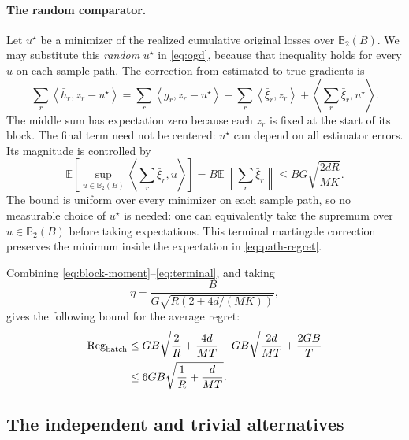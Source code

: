 \documentclass[11pt,a4paper]{article}
\numberwithin{equation}{section}
\theoremstyle{remark}
\newcommand{\E}{\mathbb E}
\newcommand{\norm}[1]{\left\lVert #1\right\rVert}
\newcommand{\ip}[2]{\left\langle #1,#2\right\rangle}
\newcommand{\B}{\mathbb B_2}
\begin{document}
\paragraph{The random comparator.}
Let $u^\star$ be a minimizer of the realized cumulative original losses
over $\B(B)$. We may substitute this \emph{random} $u^\star$ in
\eqref{eq:ogd}, because that inequality holds for every $u$ on each
sample path. The correction from estimated to true gradients is
\begin{equation}
 \sum_r\ip{\bar h_r}{z_r-u^\star}
 =\sum_r\ip{\bar g_r}{z_r-u^\star}
 -\sum_r\ip{\bar\xi_r}{z_r}
 +\ip{\sum_r\bar\xi_r}{u^\star}.          \label{eq:comparator-correction}
\end{equation}
The middle sum has expectation zero because each $z_r$ is fixed at the start of its block. The final term need not be centered: $u^\star$ can depend on all estimator errors. Its magnitude is controlled by
\begin{equation}
 \E\!\left[\sup_{u\in\B(B)}\ip{\sum_r\bar\xi_r}{u}\right]
 = B\E\norm{\sum_r\bar\xi_r}
 \le BG\sqrt{\frac{2dR}{MK}}.             \label{eq:terminal}
\end{equation}
The bound is uniform over every minimizer on each sample path, so no measurable choice of $u^\star$ is needed: one can equivalently take the supremum over $u\in\B(B)$ before taking expectations. This terminal martingale correction preserves the minimum inside the expectation in \eqref{eq:path-regret}.

Combining \eqref{eq:block-moment}--\eqref{eq:terminal}, and taking
\[
 \eta=\frac{B}{G\sqrt{R(2+4d/(MK))}},
\]
gives the following bound for the average regret:
\begin{align}
 \operatorname{Reg}_{\rm batch}
 &\le
 GB\sqrt{\frac2R+\frac{4d}{MT}}
 +GB\sqrt{\frac{2d}{MT}}+\frac{2GB}{T} \notag\\
 &\le 6GB\sqrt{\frac1R+\frac d{MT}}.      \label{eq:batch-bound}
\end{align}

\subsection{The independent and trivial alternatives}
\end{document}
